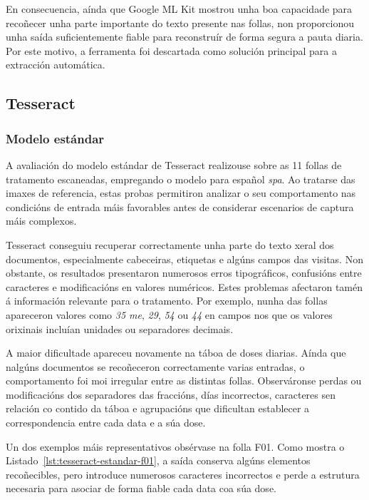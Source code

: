 En consecuencia, aínda que Google ML Kit mostrou unha boa capacidade para recoñecer unha parte importante do texto presente nas follas, non proporcionou unha saída suficientemente fiable para reconstruír de forma segura a pauta diaria. Por este motivo, a ferramenta foi descartada como solución principal para a extracción automática.



\subsection{Tesseract}

\subsubsection{Modelo estándar}

A avaliación do modelo estándar de Tesseract realizouse sobre as 11 follas de tratamento escaneadas, empregando o modelo para español \textit{spa}. Ao tratarse das imaxes de referencia, estas probas permitiron analizar o seu comportamento nas condicións de entrada máis favorables antes de considerar escenarios de captura máis complexos.

Tesseract conseguiu recuperar correctamente unha parte do texto xeral dos documentos, especialmente cabeceiras, etiquetas e algúns campos das visitas. Non obstante, os resultados presentaron numerosos erros tipográficos, confusións entre caracteres e modificacións en valores numéricos. Estes problemas afectaron tamén á información relevante para o tratamento. Por exemplo, nunha das follas apareceron valores como \textit{35 me}, \textit{29}, \textit{54} ou \textit{44} en campos nos que os valores orixinais incluían unidades ou separadores decimais. 

A maior dificultade apareceu novamente na táboa de doses diarias. Aínda que nalgúns documentos se recoñeceron correctamente varias entradas, o comportamento foi moi irregular entre as distintas follas. Observáronse perdas ou modificacións dos separadores das fraccións, días incorrectos, caracteres sen relación co contido da táboa e agrupacións que dificultan establecer a correspondencia entre cada data e a súa dose.

Un dos exemplos máis representativos obsérvase na folla F01. Como mostra o Listado~\ref{lst:tesseract-estandar-f01}, a saída conserva algúns elementos recoñecibles, pero introduce numerosos caracteres incorrectos e perde a estrutura necesaria para asociar de forma fiable cada data coa súa dose.

